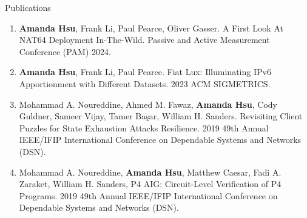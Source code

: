 \documentclass{resume} %
\begin{document}
	\begin{rSection}{Publications}
		\begin{enumerate}

			\item  \textbf{Amanda Hsu}, Frank Li, Paul Pearce, Oliver Gasser. A First Look At NAT64 Deployment In-The-Wild. Passive and Active Measurement Conference (PAM) 2024.
			
			\item  \textbf{Amanda Hsu}, Frank Li, Paul Pearce. Fiat Lux: Illuminating IPv6 Apportionment with Different Datasets. 2023 ACM SIGMETRICS.
			
			\item  Mohammad A. Noureddine, Ahmed M. Fawaz, \textbf{Amanda Hsu}, Cody Guldner, Sameer Vijay, Tamer Başar, William H. Sanders. Revisiting Client Puzzles for State Exhaustion Attacks Resilience. 2019 49th Annual IEEE/IFIP International Conference on Dependable Systems and Networks (DSN).
			
			\item Mohammad A. Noureddine, \textbf{Amanda Hsu}, Matthew Caesar, Fadi A. Zaraket, William H. Sanders, P4 AIG: Circuit-Level Verification of P4 Programs. 2019 49th Annual IEEE/IFIP International Conference on Dependable Systems and Networks (DSN).
			
		\end{enumerate}
		
	\end{rSection}
\end{document}
